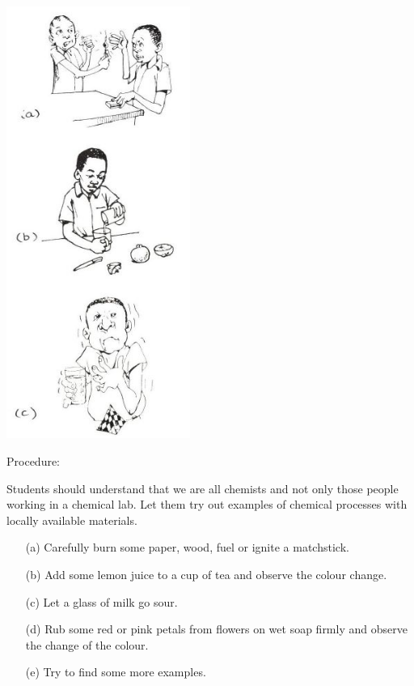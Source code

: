 \begin{multicols}{2}
\begin{center}
\includegraphics[width=0.45\textwidth]{./img/source/all-chemists.jpg}
\end{center}

\begin{description*}
\item[Procedure:]{Students should understand that we are all
chemists and not only those people working in
a chemical lab. Let them try out examples of
chemical processes with locally available
materials.
\begin{itemize}
\item[(a)] Carefully burn some paper, wood, fuel or
ignite a matchstick.
\item[(b)] Add some lemon juice to a cup of tea and
observe the colour change.
\item[(c)] Let a glass of milk go sour.
\item[(d)] Rub some red or pink petals from flowers on
wet soap firmly and observe the change of the
colour.
\item[(e)] Try to find some more examples.
\end{itemize}
}
\end{description*}



\end{multicols}

\pagebreak